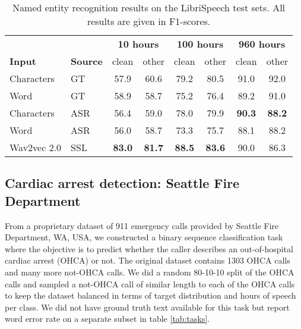 \documentclass{article}
\begin{document}
\begin{table*}[t]
\begin{center}
\begin{tabular}{ l  l | c c c c c c } 
\toprule
 
 & & \multicolumn{2}{c}{\textbf{10 hours}} & \multicolumn{2}{c}{\textbf{100 hours}} & \multicolumn{2}{c}{\textbf{960 hours}}\\
 
\textbf{Input} & \textbf{Source} & clean & other & clean & other & clean & other\\

\midrule
Characters & GT & 57.9 & 60.6 & 79.2 & 80.5 & 91.0 & 92.0 \\
Word & GT & 58.9 & 58.7 & 75.2 & 76.4 & 89.2 & 91.0 \\
\midrule
Characters & ASR & 56.4 & 59.0 & 78.0 & 79.9 & \textbf{90.3} & \textbf{88.2} \\
Word & ASR & 56.0 & 58.7 & 73.3 & 75.7 & 88.1 & 88.2 \\
Wav2vec 2.0 & SSL & \textbf{83.0} & \textbf{81.7} & \textbf{88.5} & \textbf{83.6} & 90.0 & 86.3 \\

\bottomrule
\end{tabular}
\end{center}
\vspace{-0.4cm}
\caption{Named entity recognition results on the LibriSpeech test sets. All results are given in F1-scores.} 
\label{tab:ner}
\end{table*}

\subsection{Cardiac arrest detection: Seattle Fire Department}
\label{sec:ca-task}

From a proprietary dataset of 911 emergency calls provided by Seattle Fire Department, WA, USA, we constructed a binary sequence classification task where the objective is to predict whether the caller describes an out-of-hospital cardiac arrest (OHCA) or not. The original dataset contains 1303 OHCA calls and many more not-OHCA calls. We did a random 80-10-10 split of the OHCA calls and sampled a not-OHCA call of similar length to each of the OHCA calls to keep the dataset balanced in terms of target distribution and hours of speech per class. We did not have ground truth text available for this task but report word error rate on a separate subset in table \ref{tab:tasks}.
\end{document}
